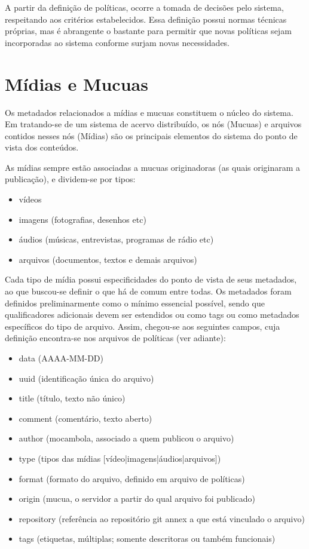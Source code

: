 A partir da definição de políticas, ocorre a tomada de decisões pelo
sistema, respeitando aos critérios estabelecidos. Essa definição
possui normas técnicas próprias, mas é abrangente o bastante para
permitir que novas políticas sejam incorporadas ao sistema conforme
surjam novas necessidades.

\section{Mídias e Mucuas}
Os metadados relacionados a mídias e mucuas constituem o núcleo do
sistema. Em tratando-se de um sistema de acervo distribuído, os nós
(Mucuas) e arquivos contidos nesses nós (Mídias) são os principais
elementos do sistema do ponto de vista dos conteúdos.

As mídias sempre estão associadas a mucuas originadoras (as quais originaram a publicação), e dividem-se por tipos:
\begin{itemize}
\item vídeos
\item imagens (fotografias, desenhos etc)
\item áudios (músicas, entrevistas, programas de rádio etc)
\item arquivos (documentos, textos e demais arquivos)
\end{itemize}

Cada tipo de mídia possui especificidades do ponto de vista de seus
metadados, ao que buscou-se definir o que há de comum entre todas. Os
metadados foram definidos preliminarmente como o mínimo essencial
possível, sendo que qualificadores adicionais devem ser estendidos ou
como tags ou como metadados específicos do tipo de arquivo. Assim,
chegou-se aos seguintes campos, cuja definição encontra-se nos
arquivos de políticas (ver adiante):
\begin{itemize}
\item data (AAAA-MM-DD)
\item uuid (identificação única do arquivo)
\item title (título, texto não único)
\item comment (comentário, texto aberto)
\item author (mocambola, associado a quem publicou o arquivo)
\item type (tipos das mídias [vídeo|imagens|áudios|arquivos])
\item format (formato do arquivo, definido em arquivo de políticas)
\item origin (mucua, o servidor a partir do qual arquivo foi
  publicado)
\item repository (referência ao repositório git annex a que está vinculado o arquivo)
\item tags (etiquetas, múltiplas; somente descritoras ou também
  funcionais)
\end{itemize}

